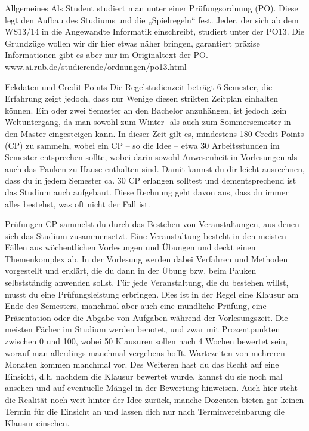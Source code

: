 Allgemeines
Als Student studiert man unter einer Prüfungsordnung (PO). Diese legt den Aufbau des Studiums und die „Spielregeln“ fest. Jeder, der sich ab dem WS13/14 in die Angewandte Informatik einschreibt, studiert unter der PO13. Die Grundzüge wollen wir dir hier etwas näher bringen, garantiert präzise Informationen gibt es aber nur im Originaltext der PO.
www.ai.rub.de/studierende/ordnungen/po13.html

Eckdaten und Credit Points
Die Regelstudienzeit beträgt 6 Semester, die Erfahrung zeigt jedoch, dass nur Wenige diesen strikten Zeitplan einhalten können. Ein oder zwei Semester an den Bachelor anzuhängen, ist jedoch kein Weltuntergang, da man sowohl zum Winter- als auch zum Sommersemester in den Master eingesteigen kann. In dieser Zeit gilt es, mindestens 180 Credit Points (CP) zu sammeln, wobei ein CP – so die Idee – etwa 30 Arbeitsstunden im Semester entsprechen sollte, wobei darin sowohl Anwesenheit in Vorlesungen als auch das Pauken zu Hause enthalten sind.
Damit kannst du dir leicht ausrechnen, dass du in jedem Semester ca. 30 CP erlangen solltest und dementsprechend ist das Studium auch aufgebaut. Diese Rechnung geht davon aus, dass du immer alles bestehst, was oft nicht der Fall ist.

Prüfungen
CP sammelst du durch das Bestehen von Veranstaltungen, aus denen sich das Studium zusammensetzt. Eine Veranstaltung besteht in den meisten Fällen aus wöchentlichen Vorlesungen und Übungen und deckt einen Themenkomplex ab. In der Vorlesung werden dabei Verfahren und Methoden vorgestellt und erklärt, die du dann in der Übung bzw. beim Pauken selbstständig anwenden sollst.
Für jede Veranstaltung, die du bestehen willst, musst du eine Prüfungsleistung erbringen. Dies ist in der Regel eine Klausur am Ende des Semesters, manchmal aber auch eine mündliche Prüfung, eine Präsentation oder die Abgabe von Aufgaben während der Vorlesungszeit. Die meisten Fächer im Studium werden benotet, und zwar mit Prozentpunkten zwischen 0 und 100, wobei 50%
Klausuren sollen nach 4 Wochen bewertet sein, worauf man allerdings manchmal vergebens hofft. Wartezeiten von mehreren Monaten kommen manchmal vor. Des Weiteren hast du das Recht auf eine Einsicht, d.h. nachdem die Klausur bewertet wurde,  kannst du sie noch mal ansehen und auf eventuelle Mängel in der Bewertung hinweisen. Auch hier steht die Realität noch weit hinter der Idee zurück, manche Dozenten bieten gar keinen Termin für die Einsicht an und lassen dich nur nach Terminvereinbarung die Klausur einsehen.

